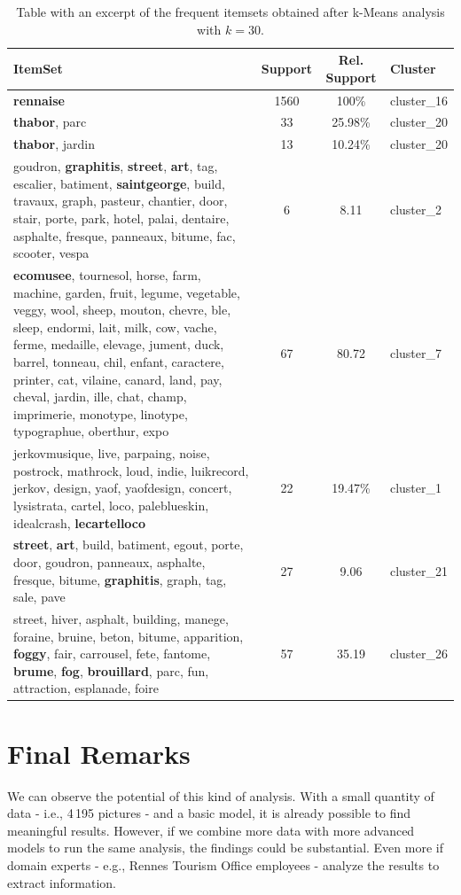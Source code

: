 \documentclass[runningheads]{llncs}
\begin{document}
\begin{table}
\caption{Table with an excerpt of the frequent itemsets obtained after k-Means analysis with $k=30$.}\label{tab3}
\begin{tabular}{|p{7cm}|c|c|l|}
\hline
\textbf{ItemSet} &  \textbf{Support} & \textbf{Rel. Support} & \textbf{Cluster}\\
\hline
\textbf{rennaise} & 1560 & 100\% & cluster\_16\\
\hline
\textbf{thabor}, parc & 33 & 25.98\% & cluster\_20\\
\hline
\textbf{thabor}, jardin & 13 & 10.24\% & cluster\_20\\
\hline
goudron, \textbf{graphitis}, \textbf{street}, \textbf{art}, tag, escalier, batiment, \textbf{saintgeorge}, build, travaux, graph, pasteur, chantier, door, stair, porte, park, hotel, palai, dentaire, asphalte, fresque, panneaux, bitume, fac, scooter, vespa & 6 & 8.11 & cluster\_2\\
\hline
\textbf{ecomusee}, tournesol, horse, farm, machine, garden, fruit, legume, vegetable, veggy, wool, sheep, mouton, chevre, ble, sleep, endormi, lait, milk, cow, vache, ferme, medaille, elevage, jument, duck, barrel, tonneau, chil, enfant, caractere, printer, cat, vilaine, canard, land, pay, cheval, jardin, ille, chat, champ, imprimerie, monotype, linotype, typographue, oberthur, expo & 67 & 80.72 & cluster\_7\\
\hline
 jerkovmusique,  live, parpaing, noise, postrock, mathrock, loud, indie, luikrecord, jerkov, design, yaof, yaofdesign, concert, lysistrata, cartel, loco, paleblueskin, idealcrash, \textbf{lecartelloco} & 22 & 19.47\% & cluster\_1\\
\hline
\textbf{street}, \textbf{art}, build, batiment, egout, porte, door, goudron, panneaux, asphalte, fresque, bitume, \textbf{graphitis}, graph, tag, sale, pave & 27 & 9.06 & cluster\_21\\
\hline
street, hiver, asphalt, building, manege, foraine, bruine, beton, bitume, apparition, \textbf{foggy}, fair, carrousel, fete, fantome, \textbf{brume}, \textbf{fog}, \textbf{brouillard}, parc, fun, attraction, esplanade, foire & 57 & 35.19 & cluster\_26\\
\hline
\end{tabular}
\end{table}

\section{Final Remarks}\label{finalRemarks}
We can observe the potential of this kind of analysis. With a small quantity of data - i.e., 4\,195 pictures - and a basic model, it is already possible to find meaningful results. However, if we combine more data with more advanced models to run the same analysis, the findings could be substantial. Even more if domain experts - e.g., Rennes Tourism Office employees - analyze the results to extract information.
\end{document}
